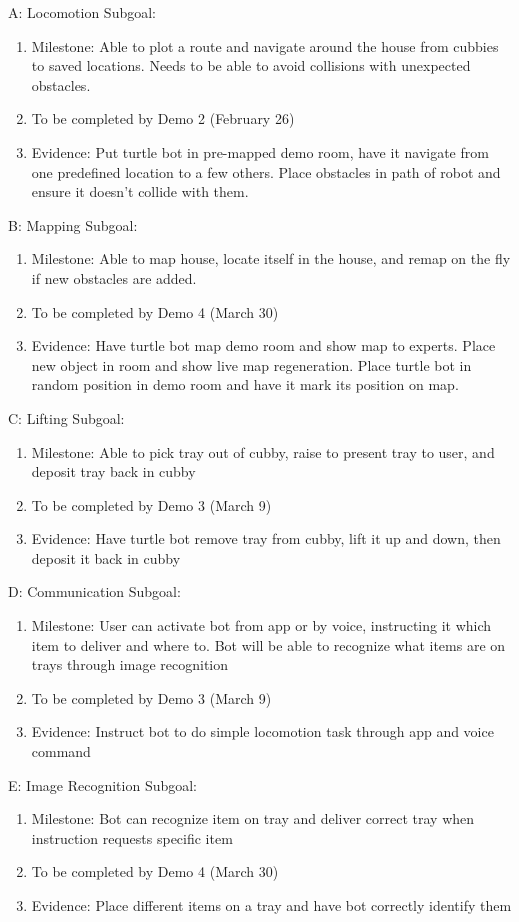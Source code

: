 \documentclass{article}
\begin{document}
A: Locomotion Subgoal:
\begin{enumerate}
\item Milestone: Able to plot a route and navigate around the house from cubbies to saved locations. Needs to be able to avoid collisions with unexpected obstacles.
\item To be completed by Demo 2 (February 26)
\item Evidence: Put turtle bot in pre-mapped demo room, have it navigate from one predefined location to a few others. Place obstacles in path of robot and ensure it doesn't collide with them.
\end{enumerate}
B: Mapping Subgoal:
\begin{enumerate}
\item Milestone: Able to map house, locate itself in the house, and remap on the fly if new obstacles are added.
\item To be completed by Demo 4 (March 30)
\item Evidence: Have turtle bot map demo room and show map to experts. Place new object in room and show live map regeneration. Place turtle bot in random position in demo room and have it mark its position on map.
\end{enumerate}
C: Lifting Subgoal:
\begin{enumerate}
\item Milestone: Able to pick tray out of cubby, raise to present tray to user, and deposit tray back in cubby
\item To be completed by Demo 3 (March 9)
\item Evidence: Have turtle bot remove tray from cubby, lift it up and down, then deposit it back in cubby
\end{enumerate}
D: Communication Subgoal:
\begin{enumerate}
\item Milestone: User can activate bot from app or by voice, instructing it which item to deliver and where to. Bot will be able to recognize what items are on trays through image recognition
\item To be completed by Demo 3 (March 9)
\item Evidence: Instruct bot to do simple locomotion task through app and voice command
\end{enumerate}
E: Image Recognition Subgoal:
\begin{enumerate}
\item Milestone: Bot can recognize item on tray and deliver correct tray when instruction requests specific item
\item To be completed by Demo 4 (March 30)
\item Evidence: Place different items on a tray and have bot correctly identify them
\end{enumerate}
\end{document}

